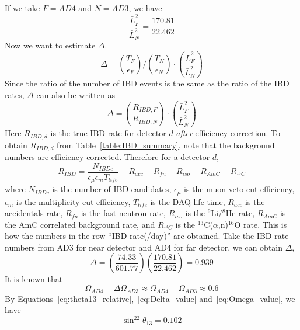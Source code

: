 If we take $F=AD4$ and $N=AD3$, we have
\begin{equation}
	\frac{\bar{L}^2_F}{\bar{L}^2_N}=\frac{170.81}{22.462}
\end{equation}
Now we want to estimate $\Delta$.
\begin{equation}
	\Delta=\left( \frac{T_F}{\epsilon_F} \right) \Big/ \left( \frac{T_N}{\epsilon_N} \right)\cdot \left(\frac{\bar{L}^2_F}{\bar{L}^2_N} \right)
\end{equation}
Since the ratio of the number of IBD events is the same as the ratio of the IBD rates, $\Delta$ can also be written as
\begin{equation}
	\Delta=\left(\frac{R_{IBD,F}}{R_{IBD,N}}\right) \cdot \left(\frac{\bar{L}^2_F}{\bar{L}^2_N} \right)
\end{equation}
Here $R_{IBD,d}$ is the true IBD rate for detector $d$ \emph{after} efficiency correction. To obtain $R_{IBD,d}$ from Table~\ref{table:IBD_summary}, note that the background numbers are efficiency corrected. Therefore for a detector $d$,
\begin{equation}
	R_{IBD}=\frac{N_{IBDc}}{\epsilon_\mu\epsilon_m T_{life}}-R_{acc}-R_{fn}-R_{iso}-R_{AmC}-R_{^{13}C}
\end{equation}
where $N_{IBDc}$ is the number of IBD candidates, $\epsilon_\mu$ is the muon veto cut efficiency, $\epsilon_m$ is the multiplicity cut efficiency, $T_{life}$ is the DAQ life time, $R_{acc}$ is the accidentals rate, $R_{fn}$ is the fast neutron rate, $R_{iso}$ is the $^9$Li/$^8$He rate, $R_{AmC}$ is the AmC correlated background rate, and $R_{^{13}C}$ is the $^{13}$C($\alpha$,n)$^{16}$O rate. This is how the numbers in the row ``IBD rate(/day)'' are obtained. Take the IBD rate numbers from AD3 for near detector and AD4 for far detector, we can obtain $\Delta$,
\begin{equation}\label{eq:Delta_value}
	\Delta=\left(\frac{74.33}{601.77}\right)\left(\frac{170.81}{22.462}\right)=0.939
\end{equation}
It is known that
\begin{equation}\label{eq:Omega_value}
	\Omega_{AD4}-\Delta\Omega_{AD3}\approx \Omega_{AD4}-\Omega_{AD3}\approx 0.6
\end{equation}
By Equations~\ref{eq:theta13_relative},~\ref{eq:Delta_value} and~\ref{eq:Omega_value}, we have
\begin{equation}
	\boxed{\sin^22\theta_{13}=0.102}
\end{equation}


